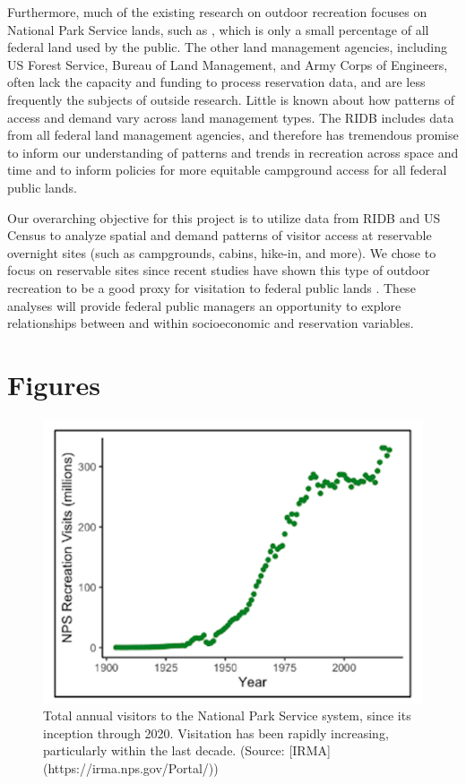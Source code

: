 \documentclass[
]{book}
\begin{document}
Furthermore, much of the existing research on outdoor recreation focuses on National Park Service lands, such as \citet{Walls2018}, which is only a small percentage of all federal land used by the public. The other land management agencies, including US Forest Service, Bureau of Land Management, and Army Corps of Engineers, often lack the capacity and funding to process reservation data, and are less frequently the subjects of outside research. Little is known about how patterns of access and demand vary across land management types. The RIDB includes data from all federal land management agencies, and therefore has tremendous promise to inform our understanding of patterns and trends in recreation across space and time and to inform policies for more equitable campground access for all federal public lands.

Our overarching objective for this project is to utilize data from RIDB and US Census to analyze spatial and demand patterns of visitor access at reservable overnight sites (such as campgrounds, cabins, hike-in, and more). We chose to focus on reservable sites since recent studies have shown this type of outdoor recreation to be a good proxy for visitation to federal public lands \citep{Walls2018}. These analyses will provide federal public managers an opportunity to explore relationships between and within socioeconomic and reservation variables.

\hypertarget{figures}{%
\section{Figures}\label{figures}}

\begin{figure}
\includegraphics[width=10in]{images/problem_statement_figure_1} \caption{Total annual visitors to the National Park Service system, since its inception through 2020. Visitation has been rapidly increasing, particularly within the last decade. (Source: [IRMA](https://irma.nps.gov/Portal/))}\label{fig:fig1}
\end{figure}
\end{document}
